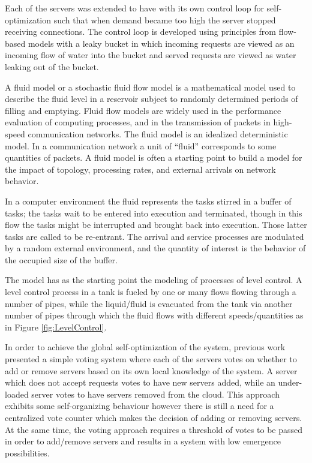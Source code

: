 \documentclass{sig-alternate}
\begin{document}
Each of the servers was extended to have with its own control loop for self-optimization such that when demand became too high the server stopped receiving connections. The control loop is developed using principles from flow-based models with a leaky bucket in which incoming requests are viewed as an incoming flow of water into the bucket and served requests are viewed as water leaking out of the bucket.

A fluid model or a stochastic fluid flow model is a mathematical model used to describe the fluid level in a reservoir subject to randomly determined periods of filling and emptying. Fluid flow models are widely used in the performance evaluation of computing processes, and in the transmission of packets in high-speed communication networks. The fluid model is an idealized deterministic model. In a communication network a unit of ``fluid'' corresponds to some quantities of packets. A fluid model is often a starting point to build a model for the impact of topology, processing rates, and external arrivals on network behavior.

In a computer environment the fluid represents the tasks stirred in a buffer of tasks; the tasks wait to be entered into execution and terminated, though in this flow the tasks might be interrupted and brought back into execution. Those latter tasks are called to  be re-entrant. The arrival and service processes are modulated by a random external environment, and the quantity of interest is the behavior of the occupied size of the buffer.

The model has as the starting point the modeling of processes of level control. A level control process in a tank is fueled by one or many flows flowing through a number of pipes, while the liquid/fluid is evacuated from the tank via another number of pipes through which the fluid flows with different speeds/quantities as in Figure \ref{fig:LevelControl}.

In order to achieve the global self-optimization of the system, previous work presented a simple voting system where each of the servers votes on whether to add or remove servers based on its own local knowledge of the system. A server which does not accept requests votes to have new servers added, while an under-loaded server votes to have servers removed from the cloud. This approach exhibits some self-organizing behaviour however there is still a need for a centralized vote counter which makes the decision of adding or removing servers. At the same time, the voting approach requires a threshold of votes to be passed in order to add/remove servers and results in a system with low emergence possibilities.
\end{document}
